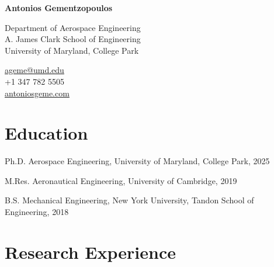 \documentclass[12pt,letterpaper]{report}
\newcommand{\myname}{Antonios Gementzopoulos}
\newcommand{\namefont}[1]{{\normalfont\bfseries\Huge{#1}}}
\begin{document}
    \raggedright{}

    \namefont{\myname}

    \vspace{1em}
    \begin{minipage}[t]{0.700\textwidth}
        Department of Aerospace Engineering \\
        A. James Clark School of Engineering \\
        University of Maryland, College Park
    \end{minipage}
    \begin{minipage}[t]{0.295\textwidth}
        \flushright{}
        \href{mailto:ageme@umd.edu}{ageme@umd.edu} \\
        +1 347 782 5505 \\
        \href{https://antoniosgeme.com}{antoniosgeme.com}
    \end{minipage}


    \section*{Education}

    \begin{tablist}

        \item[Ph.D.] \tab{}Aerospace Engineering, University of Maryland, College Park, 2025

        \item[M.Res.]  \tab{}Aeronautical Engineering, University of Cambridge, 2019
        \item[B.S.]  \tab{}Mechanical Engineering, New York University, Tandon School of Engineering, 2018

    \end{tablist}


    \section*{Research Experience}
\end{document}
